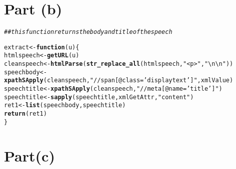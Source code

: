 \documentclass[english]{article}\usepackage[]{graphicx}\usepackage[]{color}
\makeatletter
\newcommand{\hlstr}[1]{\textcolor[rgb]{0.192,0.494,0.8}{#1}}%
\newcommand{\hlcom}[1]{\textcolor[rgb]{0.678,0.584,0.686}{\textit{#1}}}%
\newcommand{\hlstd}[1]{\textcolor[rgb]{0.345,0.345,0.345}{#1}}%
\newcommand{\hlkwa}[1]{\textcolor[rgb]{0.161,0.373,0.58}{\textbf{#1}}}%
\newcommand{\hlkwb}[1]{\textcolor[rgb]{0.69,0.353,0.396}{#1}}%
\newcommand{\hlkwc}[1]{\textcolor[rgb]{0.333,0.667,0.333}{#1}}%
\newcommand{\hlkwd}[1]{\textcolor[rgb]{0.737,0.353,0.396}{\textbf{#1}}}%
\newenvironment{kframe}{%
 \def\at@end@of@kframe{}%
 \ifinner\ifhmode%
  \def\at@end@of@kframe{\end{minipage}}%
  \begin{minipage}{\columnwidth}%
 \fi\fi%
 \def\FrameCommand##1{\hskip\@totalleftmargin \hskip-\fboxsep
 \colorbox{shadecolor}{##1}\hskip-\fboxsep
     \hskip-\linewidth \hskip-\@totalleftmargin \hskip\columnwidth}%
 \MakeFramed {\advance\hsize-\width
   \@totalleftmargin\z@ \linewidth\hsize
   \@setminipage}}%
 {\par\unskip\endMakeFramed%
 \at@end@of@kframe}
\newenvironment{knitrout}{}{} %
\makeatother
\begin{document}
\section*{Part (b)}

\begin{knitrout}
\color{fgcolor}\begin{kframe}
\begin{alltt}
\hlcom{## this function returns the body and title of the speech}

\hlstd{extract}\hlkwb{<-}\hlkwa{function}\hlstd{(}\hlkwc{u}\hlstd{)\{}
        \hlstd{htmlspeech}\hlkwb{<-}\hlkwd{getURL}\hlstd{(u)}
        \hlstd{cleanspeech}\hlkwb{<-}\hlkwd{htmlParse}\hlstd{(}\hlkwd{str_replace_all}\hlstd{(htmlspeech,}\hlstr{"<p>"}\hlstd{,} \hlstr{"\textbackslash{}n\textbackslash{}n"}\hlstd{))}
        \hlstd{speechbody}\hlkwb{<-}\hlkwd{xpathSApply}\hlstd{(cleanspeech,}\hlstr{"//span[@class='displaytext']"}\hlstd{,xmlValue)}
        \hlstd{speechtitle}\hlkwb{<-}\hlkwd{xpathSApply}\hlstd{(cleanspeech,} \hlstr{"//meta[@name='title']"}\hlstd{)}
        \hlstd{speechtitle}\hlkwb{<-}\hlkwd{sapply}\hlstd{(speechtitle,xmlGetAttr,}\hlstr{"content"}\hlstd{)}
        \hlstd{ret1}\hlkwb{<-}\hlkwd{list}\hlstd{(speechbody,speechtitle)}
        \hlkwd{return}\hlstd{(ret1)}
\hlstd{\}}
\end{alltt}
\end{kframe}
\end{knitrout}


\section*{Part(c)}
\end{document}
